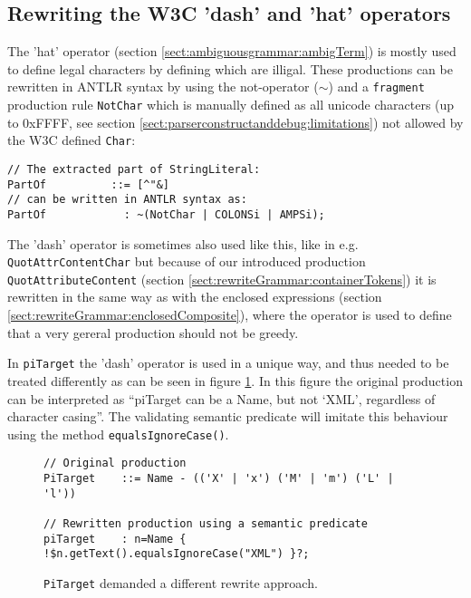 \subsection{Rewriting the W3C 'dash' and 'hat' operators}
\label{sect:implementation:dashOperator}
The 'hat' operator (section \ref{sect:ambiguousgrammar:ambigTerm}) is mostly used to define legal characters by defining which are illigal. These productions can be rewritten in ANTLR syntax by using the not-operator ($\sim$) and a \verb!fragment! production rule \verb!NotChar! which is manually defined as all unicode characters (up to 0xFFFF, see section \ref{sect:parserconstructanddebug:limitations}) not allowed by the W3C defined \verb!Char!:
\begin{Verbatim}
// The extracted part of StringLiteral:
PartOf          ::= [^"&]
// can be written in ANTLR syntax as:
PartOf            : ~(NotChar | COLONSi | AMPSi);
\end{Verbatim}
The 'dash' operator is sometimes also used like this, like in e.g. \verb!QuotAttrContentChar! but because of our introduced production \verb!QuotAttributeContent! (section \ref{sect:rewriteGrammar:containerTokens}) it is rewritten in the same way as with the enclosed expressions (section \ref{sect:rewriteGrammar:enclosedComposite}), where the operator is used to define that a very gereral production should not be greedy. 

In \verb!piTarget! the 'dash' operator is used in a unique way, and thus needed to be treated differently as can be seen in figure \ref{fig:pitargetRewritten}. In this figure the original production can be interpreted as ``piTarget can be a Name, but not `XML', regardless of character casing''. The validating semantic predicate will imitate this behaviour using the method \verb!equalsIgnoreCase()!.
\begin{figure}[h!]
\begin{Verbatim}
// Original production
PiTarget    ::= Name - (('X' | 'x') ('M' | 'm') ('L' | 'l'))

// Rewritten production using a semantic predicate
piTarget    : n=Name { !$n.getText().equalsIgnoreCase("XML") }?;
\end{Verbatim}
\caption[Rewrite of 'dash' operator]{\texttt{PiTarget} demanded a different rewrite approach.}
\label{fig:pitargetRewritten}
\end{figure}


